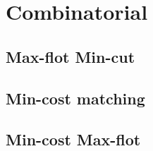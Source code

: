 \newpage
\section{Combinatorial}

\subsection{Max-flot Min-cut}


\subsection{Min-cost matching}


\subsection{Min-cost Max-flot}

